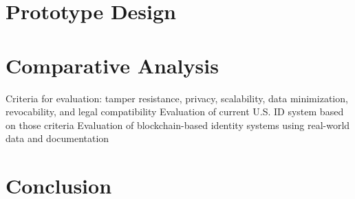 \documentclass[conference]{IEEEtran}
\begin{document}
\section{Prototype Design}

\section{Comparative Analysis}
Criteria for evaluation: tamper resistance, privacy, scalability, data minimization, revocability, and legal compatibility
Evaluation of current U.S. ID system based on those criteria
Evaluation of blockchain-based identity systems using real-world data and documentation

\section{Conclusion}

\begin{thebibliography}{00}
\end{thebibliography}
\end{document}
